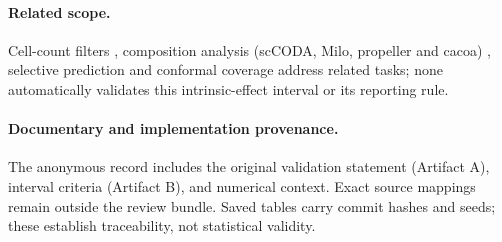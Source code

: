\paragraph{Related scope.}\label{app:relatedwork}
Cell-count filters \citep{crowell2020}, composition analysis (scCODA, Milo, propeller and cacoa)
\citep{buettner2021,dann2022,phipson2022,petukhov2022}, selective prediction \citep{chow1970,elyaniv2010,geifman2017}
and conformal coverage \citep{vovk2005,angelopoulos2023} address related tasks;
none automatically validates this intrinsic-effect interval or its reporting rule.

\paragraph{Documentary and implementation provenance.}\label{app:provenance}\label{app:withdrawn}
The anonymous record includes the original validation statement (Artifact A),
interval criteria (Artifact B), and numerical context. Exact source mappings
remain outside the review bundle. Saved tables carry commit hashes and seeds;
these establish traceability, not statistical validity.
